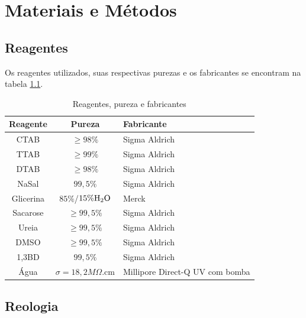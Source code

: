\part{Materiais e Métodos}
	\chapter{Reagentes}
	
	Os reagentes utilizados, suas respectivas purezas e os fabricantes se encontram na tabela \ref{tab:reagentes}.
	
	\begin{table}[H]
		\IBGEtab%
		{\caption{Reagentes, pureza e fabricantes}
		\label{tab:reagentes}}%
	    {
		\centering
		\begin{tabular}{c c p{3.2cm}}
			\toprule
			Reagente  & Pureza                                      & Fabricante    \\ \midrule
			  CTAB    & \(\geqslant 98\%\)                            & Sigma Aldrich \\
			  TTAB    & \(\geqslant 99\%\)                            & Sigma Aldrich \\
			  DTAB	  & \(\geqslant 98\%\)							& Sigma Aldrich \\
			  NaSal   & \(99{,}5\%\)                                    & Sigma Aldrich \\
			Glicerina & \(85\%\)/\(15\%\textnormal{H}_2\textnormal{O}\) & Merck         \\
			Sacarose  & \(\geqslant 99{,}5\%\)                          & Sigma Aldrich \\
			  Ureia   & \(\geqslant 99{,}5\%\)                          & Sigma Aldrich \\
			  DMSO    & \(\geqslant 99{,}5\%\)                          & Sigma Aldrich \\
			  1,3BD   & \(99{,}5\%\)                                    & Sigma Aldrich \\ 
			  Água    & \(\sigma = 18{,}2M\Omega\).cm					& Millipore Direct-Q\textregistered{} \newline 3 UV com bomba  \\ \bottomrule
		\end{tabular}}%
		{}
	\end{table}
	
	\chapter{Reologia}
